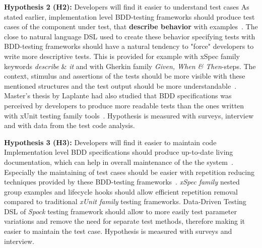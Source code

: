    \begin{addmargin}[0em]{0em}
    \vspace{10px}
    \textbf{Hypothesis 2 (H2):} Developers will find it easier to understand test cases
    \vspace{5px}
    \newline
    As stated earlier, implementation level BDD-testing frameworks should produce test cases of the component under test,
    that \textbf{describe behavior} with examples~\cite{chelimsky2010rspec,astels2006new,amodeo2015learning}.
    The close to natural language DSL used to create these behavior specifying tests with BDD-testing frameworks should
    have a natural tendency to "force" developers to write more descriptive tests. This is provided for example
    with xSpec family keywords \textit{describe} \& \textit{it} and with Gherkin family \textit{Given, When \& Then}-steps.
    The context, stimulus and assertions of the tests should be more visible with these mentioned structures and the test output
    should be more understandable~\cite{smart2014bdd}. Master's thesis by Laplante had also studied that BDD specifications
    was perceived by developers to produce more readable tests than the ones written with xUnit testing family tools~\cite{laplante2009behavior}.
    Hypothesis is measured with surveys, interview and with data from the test code analysis.
    \end{addmargin}

    \begin{addmargin}[0em]{0em}
    \vspace{10px}
    \textbf{Hypothesis 3 (H3):} Developers will find it easier to maintain code
    \vspace{5px}
    \newline
    Implementation level BDD specifications should produce up-to-date living documentation, which can help in overall
    maintenance of the the system~\cite{smart2014bdd}. Especially the maintaining of test cases should be easier
    with repetition reducing techniques provided by these BDD-testing frameworks~\cite{chelimsky2010rspec,kapelonis2016java}.
    \textit{xSpec family} nested group examples and lifecycle hooks should allow efficient repetition removal compared to
    traditional \textit{xUnit family} testing frameworks.
    Data-Driven Testing DSL of \textit{Spock} testing framework should allow to more easily test parameter variations and remove
    the need for separate test methods, therefore making it easier to maintain the test case.
    Hypothesis is measured with surveys and interview.
    \end{addmargin}


